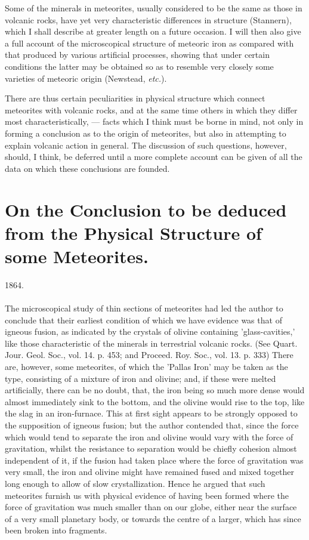 \documentclass[a4paper, 12pt, oneside]{article}
\begin{document}
Some of the minerals in meteorites, usually considered to be the same as those in volcanic rocks, have yet very characteristic differences in structure (Stannern), which I shall describe at greater length on a future occasion. I will then also give a full account of the microscopical structure of meteoric iron as compared with that produced by various artificial processes, showing that under certain conditions the latter may be obtained so as to resemble very closely some varieties of meteoric origin (Newstead, \emph{etc.}).

There are thus certain peculiarities in physical structure which connect meteorites with volcanic rocks, and at the same time others in which they differ most characteristically, --- facts which I think must be borne in mind, not only in forming a conclusion as to the origin of meteorites, but also in attempting to explain volcanic action in general. The discussion of such questions, however, should, I think, be deferred until a more complete account can be given of all the data on which these conclusions are founded.
\clearpage
\section{On the Conclusion to be deduced from the Physical Structure of some Meteorites.}
\begin{center}
1864.
\end{center}
\paragraph{}
The microscopical study of thin sections of meteorites had led the author to conclude that their earliest condition of which we have evidence was that of igneous fusion, as indicated by the crystals of olivine containing 'glass-cavities,' like those characteristic of the minerals in terrestrial volcanic rocks. (See Quart. Jour. Geol. Soc., vol. 14. p. 453; and Proceed. Roy. Soc., vol. 13. p. 333) There are, however, some meteorites, of which the 'Pallas Iron' may be taken as the type, consisting of a mixture of iron and olivine; and, if these were melted artificially, there can be no doubt, that, the iron being so much more dense would almost immediately sink to the bottom, and the olivine would rise to the top, like the slag in an iron-furnace. This at first sight appears to be strongly opposed to the supposition of igneous fusion; but the author contended that, since the force which would tend to separate the iron and olivine would vary with the force of gravitation, whilst the resistance to separation would be chiefly cohesion almost independent of it, if the fusion had taken place where the force of gravitation was very small, the iron and olivine might have remained fused and mixed together long enough to allow of slow crystallization. Hence he argued that such meteorites furnish us with physical evidence of having been formed where the force of gravitation was much smaller than on our globe, either near the surface of a very small planetary body, or towards the centre of a larger, which has since been broken into fragments.
\clearpage
\end{document}
